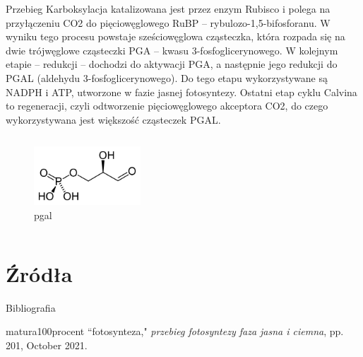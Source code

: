 \documentclass{beamer}
\begin{document}
\begin{frame}{Przebieg}
Karboksylacja katalizowana jest przez enzym Rubisco i polega na przyłączeniu CO2 do pięciowęglowego RuBP – rybulozo-1,5-bifosforanu. W wyniku tego procesu powstaje sześciowęglowa cząsteczka, która rozpada się na dwie trójwęglowe cząsteczki PGA – kwasu 3-fosfoglicerynowego. W kolejnym etapie – redukcji – dochodzi do aktywacji PGA, a następnie jego redukcji do PGAL (aldehydu 3-fosfoglicerynowego). Do tego etapu wykorzystywane są NADPH i ATP, utworzone w fazie jasnej fotosyntezy. Ostatni etap cyklu Calvina to regeneracji, czyli odtworzenie pięciowęglowego akceptora CO2, do czego wykorzystywana jest większość cząsteczek PGAL.
	\begin{columns}
		\begin{figure}
			\hspace*{-3cm}
			\includegraphics[width=4cm]{pgal.png}
			\caption{pgal}
		\end{figure}
		

	\end{columns}
\end{frame}

\section{Źródła}
\begin{frame}{Bibliografia}
\begin{thebibliography}{10}
	matura100procent ``fotosynteza," \emph{przebieg fotosyntezy faza jasna i ciemna}, pp. 201, October 2021.
\end{thebibliography}
\end{frame}
\end{document}
